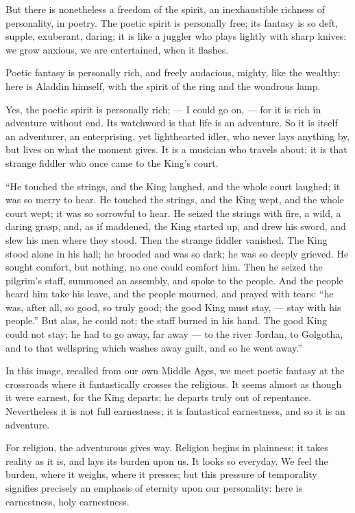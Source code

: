 \documentclass[12pt,a4paper]{book}
\begin{document}
But there is nonetheless a freedom of the spirit, an inexhaustible richness of personality, in poetry. The poetic spirit is personally free; its fantasy is so deft, supple, exuberant, daring; it is like a juggler who plays lightly with sharp knives: we grow anxious, we are entertained, when it flashes.

Poetic fantasy is personally rich, and freely audacious, mighty, like the wealthy: here is Aladdin himself, with the spirit of the ring and the wondrous lamp.

Yes, the poetic spirit is personally rich; --- I could go on, --- for it is rich in adventure without end. Its watchword is that life is an adventure. So it is itself an adventurer, an enterprising, yet lighthearted idler, who never lays anything by, but lives on what the moment gives. It is a musician who travels about; it is that strange fiddler who once came to the King's court.

``He touched the strings, and the King laughed, and the whole court laughed; it was so merry to hear. He touched the strings, and the King wept, and the whole court wept; it was so sorrowful to hear. He seized the strings with fire, a wild, a daring grasp, and, as if maddened, the King started up, and drew his sword, and slew his men where they stood. Then the strange fiddler vanished. The King stood alone in his hall; he brooded and was so dark; he was so deeply grieved. He sought comfort, but nothing, no one could comfort him. Then he seized the pilgrim's staff, summoned an assembly, and spoke to the people. And the people heard him take his leave, and the people mourned, and prayed with tears: ``he was, after all, so good, so truly good; the good King must stay, --- stay with his people.'' But alas,
he could not; the staff burned in his hand. The good King could not stay; he had to go away, far away --- to the river Jordan, to Golgotha, and to that wellspring which washes away guilt, and so he went away.''

In this image, recalled from our own Middle Ages, we meet poetic fantasy at the crossroads where it fantastically crosses the religious. It seems almost as though it were earnest, for the King departs; he departs truly out of repentance. Nevertheless it is not full earnestness; it is fantastical earnestness, and so it is an adventure.

For religion, the adventurous gives way. Religion begins in plainness; it takes reality as it is, and lays its burden upon us. It looks so everyday. We feel the burden, where it weighs, where it presses; but this pressure of temporality signifies precisely an emphasis of eternity upon our personality: here is earnestness, holy earnestness.
\end{document}
